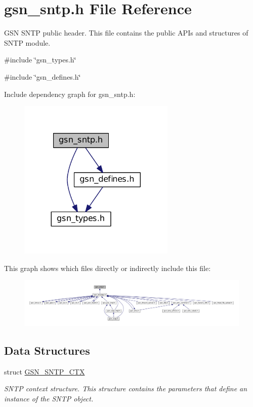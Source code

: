\hypertarget{a00585}{
\section{gsn\_\-sntp.h File Reference}
\label{a00585}
}


GSN SNTP public header. This file contains the public APIs and structures of SNTP module.  


{\ttfamily \#include \char`\"{}gsn\_\-types.h\char`\"{}}\par
{\ttfamily \#include \char`\"{}gsn\_\-defines.h\char`\"{}}\par
Include dependency graph for gsn\_\-sntp.h:
\nopagebreak
\begin{figure}[H]
\begin{center}
\leavevmode
\includegraphics[width=212pt]{a00823}
\end{center}
\end{figure}
This graph shows which files directly or indirectly include this file:
\nopagebreak
\begin{figure}[H]
\begin{center}
\leavevmode
\includegraphics[width=400pt]{a00824}
\end{center}
\end{figure}
\subsection*{Data Structures}
\begin{DoxyCompactItemize}
\item 
struct \hyperlink{a00227}{GSN\_\-SNTP\_\-CTX}
\begin{DoxyCompactList}\small\item\em SNTP context structure. This structure contains the parameters that define an instance of the SNTP object. \end{DoxyCompactList}\end{DoxyCompactItemize}
